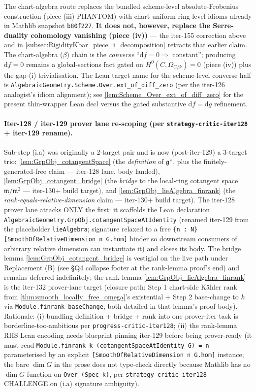 The chart-algebra route replaces the bundled scheme-level absolute-Frobenius construction (piece (iii) PHANTOM) with chart-uniform ring-level idioms already in Mathlib snapshot \texttt{b80f227}. \textbf{It does not, however, replace the Serre-duality cohomology vanishing (piece (iv))} --- the iter-155 correction above and in \cref{subsec:RigidityKbar_piece_i_decomposition} retracts that earlier claim. The chart-algebra (\(\beta\)) chain is the \emph{converse} ``\(\mathrm df = 0 \Rightarrow\) constant''; producing \(\mathrm df = 0\) remains a global-sections fact gated on \(H^0(C, \Omega_{C/k}) = 0\) (piece (iv)) plus the gap-(i) trivialisation. The Lean target name for the scheme-level converse half is \texttt{AlgebraicGeometry.Scheme.Over.ext\_of\_diff\_zero} (per the iter-126 analogist's idiom alignment); see \cref{lem:Scheme_Over_ext_of_diff_zero} for the present thin-wrapper Lean decl versus the gated substantive \(\mathrm df = \mathrm dg\) refinement.

\paragraph{Iter-128 / iter-129 prover lane re-scoping (per \texttt{strategy-critic-iter128} + iter-129 rename).} Sub-step (i.a) was originally a 2-target pair and is now (post-iter-129) a 3-target trio: \cref{lem:GrpObj_cotangentSpace} (the \emph{definition} of \(\mathfrak g^\vee\), plus the finitely-generated-free claim — iter-128 lane, body landed), \cref{lem:GrpObj_cotangent_bridge} (the \emph{bridge} to the local-ring cotangent space \(\mathfrak m / \mathfrak m^{2}\) — iter-130+ build target), and \cref{lem:GrpObj_lieAlgebra_finrank} (the \emph{rank-equals-relative-dimension} claim — iter-130+ build target). The iter-128 prover lane attacks ONLY the first: it scaffolds the Lean declaration \texttt{AlgebraicGeometry.GrpObj.cotangentSpaceAtIdentity} (renamed iter-129 from the placeholder \texttt{lieAlgebra}; signature relaxed to a free \texttt{\{n : \mathbb N\} [SmoothOfRelativeDimension n G.hom]} binder so downstream consumers of arbitrary relative dimension can instantiate it) and closes its body. The bridge lemma \cref{lem:GrpObj_cotangent_bridge} is vestigial on the live path under Replacement (B) (see \S Q4 collapse footer at the rank-lemma proof's end) and remains deferred indefinitely; the rank lemma \cref{lem:GrpObj_lieAlgebra_finrank} is the iter-132 prover-lane target (closure path: Step 1 chart-side Kähler rank from \cref{thm:smooth_locally_free_omega}'s existential + Step 2 base-change to \(k\) via \texttt{Module.finrank\_baseChange}, both detailed in that lemma's proof body). Rationale: (i) bundling definition + bridge + rank into one prover-iter task is borderline-too-ambitious per \texttt{progress-critic-iter128}; (ii) the rank-lemma RHS Lean encoding needs blueprint pinning iter-129 before being prover-ready (it must read \texttt{Module.finrank k (cotangentSpaceAtIdentity G) = n} parameterised by an explicit \texttt{[SmoothOfRelativeDimension n G.hom]} instance; the bare \(\dim G\) in the prose does not type-check directly because Mathlib has no \(\dim G\) function on \texttt{Over (Spec k)}, per \texttt{strategy-critic-iter128} CHALLENGE on (i.a) signature ambiguity).

